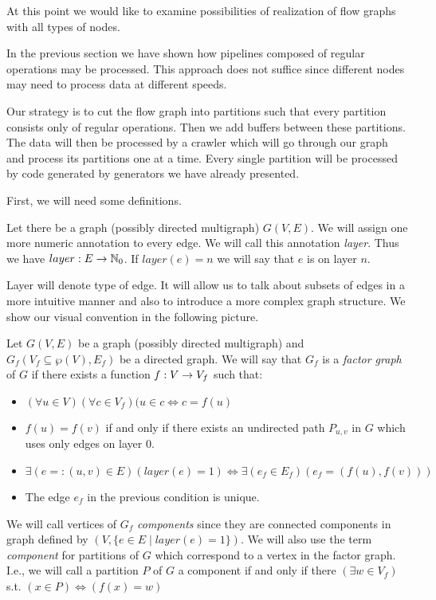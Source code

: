 At this point we would like to examine possibilities of realization of flow graphs with all types of nodes. 

\parspace

In the previous section we have shown how pipelines composed of regular operations may be processed. This approach does not suffice since different nodes may need to process data at different speeds. 

\parspace

\FloatBarrier

Our strategy is to cut the flow graph into partitions such that every partition consists only of regular operations. Then we add buffers between these partitions. The data will then be processed by a crawler which will go through our graph and process its partitions one at a time. Every single partition will be processed by code generated by generators we have already presented. 

\parspace

First, we will need some definitions.

\begin{define}
Let there be a graph (possibly directed multigraph) $G(V,E)$. We will assign one more numeric annotation to every edge. We will call this annotation \emph{layer}. Thus we have $layer: E \rightarrow \mathbb{N}_0$. If $layer(e) = n$ we will say that $e$ is on layer $n$.
\end{define}

Layer will denote type of edge. It will allow us to talk about subsets of edges in a more intuitive manner and also to introduce a more complex graph structure. We show our visual convention in the following picture.


\begin{define}
  Let $G(V,E)$ be a graph (possibly directed multigraph) and $G_f(V_f \subseteq \wp(V),E_f)$ be a directed graph. We will say that $G_f$ is a \emph{factor graph} of $G$ if there exists a function $f: V \rightarrow V_f$ such that:
  \begin{itemize}
    \item $(\forall u \in V)(\forall c \in V_f)( u \in c \Longleftrightarrow c = f(u) $
    \item $f(u) = f(v)$ if and only if there exists an undirected path $P_{u,v}$ in $G$ which uses only edges on layer 0.
    \item $\exists(e =: (u,v) \in E)(layer(e) = 1) \Longleftrightarrow \exists(e_f \in E_f)( e_f = (f(u), f(v)) )$  
    \item The edge $e_f$ in the previous condition is unique.
  \end{itemize}
  We will call vertices of $G_f$ \emph{components} since they are connected components in graph defined by $(V, \{e \in E \mid layer(e) = 1 \})$. We will also use the term \emph{component} for partitions of $G$ which correspond to a vertex in the factor graph. I.e., we will call a partition $P$ of $G$ a component if and only if there $(\exists w \in V_f)$ s.t. $(x \in P) \Longleftrightarrow ( f(x) = w)$
\end{define}

